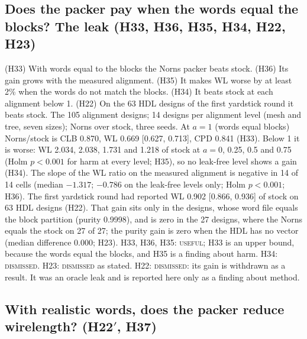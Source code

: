 \subsection{Does the packer pay when the words equal the blocks? The leak (H33, H36, H35, H34, H22, H23)}
\label{sec:e-leak}

 (H33) With words equal to the blocks the Norns packer beats stock. (H36) Its gain grows with the measured alignment. (H35) It makes WL worse by at least 2\% when the words do not match the blocks. (H34) It beats stock at each alignment below 1. (H22) On the 63 HDL designs of the first yardstick round it beats stock.
 The 105 alignment designs; 14 designs per alignment level (mesh and tree, seven sizes); Norns over stock, three seeds.
 At $a=1$ (words equal blocks) Norns/stock is CLB 0.870, WL 0.669 [0.627, 0.713], CPD 0.841 (H33). %
Below 1 it is worse: WL 2.034, 2.038, 1.731 and 1.218 of stock at $a=0$, 0.25, 0.5 and 0.75 (Holm $p<0.001$ for harm at every level; H35), so no leak-free level shows a gain (H34). %
The slope of the WL ratio on the measured alignment is negative in 14 of 14 cells (median $-1.317$; $-0.786$ on the leak-free levels only; Holm $p<0.001$; H36). %
The first yardstick round had reported WL 0.902 [0.866, 0.936] of stock on 63 HDL designs (H22). %
That gain sits only in the  designs, whose word file equals the block partition (purity 0.9998), and is zero in the 27  designs, where the Norns  equals the stock  on 27 of 27; the purity gain is zero when the HDL has no vector (median difference 0.000; H23). %
 H33, H36, H35: \textsc{useful}; H33 is an upper bound, because the words equal the blocks, and H35 is a finding about harm. H34: \textsc{dismissed}. H23: \textsc{dismissed} as stated. H22: \textsc{dismissed}: its gain is withdrawn as a result. It was an oracle leak and is reported here only as a finding about method.

\subsection{With realistic words, does the packer reduce wirelength? (H22$'$, H37)}
\label{sec:e-h22p}

